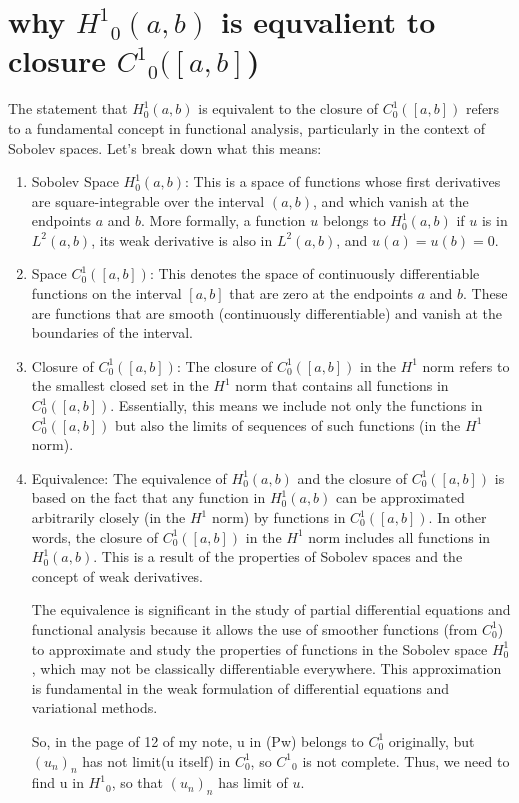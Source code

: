 \documentclass[a4paper,12pt]{article} %
\begin{document}
\newpage
\section{\textbf{why ${H^1}_{0}(a ,b)$ is equvalient to closure ${C^1}_{0}([a ,b]$) }}


The statement that \( H_0^1(a, b) \) is equivalent to the closure of \( C_0^1([a, b]) \) refers to a fundamental concept in functional analysis, particularly in the context of Sobolev spaces. Let's break down what this means:
\begin{enumerate}
   \item Sobolev Space \( H_0^1(a, b) \): This is a space of functions whose first derivatives are square-integrable over the interval \((a, b)\), and which vanish at the endpoints \( a \) and \( b \). More formally, a function \( u \) belongs to \( H_0^1(a, b) \) if \( u \) is in \( L^2(a, b) \), its weak derivative is also in \( L^2(a, b) \), and \( u(a) = u(b) = 0 \).

   \item Space \( C_0^1([a, b]) \): This denotes the space of continuously differentiable functions on the interval \([a, b]\) that are zero at the endpoints \( a \) and \( b \). These are functions that are smooth (continuously differentiable) and vanish at the boundaries of the interval.

   \item Closure of \( C_0^1([a, b]) \): The closure of \( C_0^1([a, b]) \) in the \( H^1 \) norm refers to the smallest closed set in the \( H^1 \) norm that contains all functions in \( C_0^1([a, b]) \). Essentially, this means we include not only the functions in \( C_0^1([a, b]) \) but also the limits of sequences of such functions (in the \( H^1 \) norm).

   \item Equivalence: The equivalence of \( H_0^1(a, b) \) and the closure of \( C_0^1([a, b]) \) is based on the fact that any function in \( H_0^1(a, b) \) can be approximated arbitrarily closely (in the \( H^1 \) norm) by functions in \( C_0^1([a, b]) \). In other words, the closure of \( C_0^1([a, b]) \) in the \( H^1 \) norm includes all functions in \( H_0^1(a, b) \). This is a result of the properties of Sobolev spaces and the concept of weak derivatives.

The equivalence is significant in the study of partial differential equations and functional analysis because it allows the use of smoother functions (from \( C_0^1 \)) to approximate and study the properties of functions in the Sobolev space \( H_0^1 \), which may not be classically differentiable everywhere. This approximation is fundamental in the weak formulation of differential equations and variational methods.

So, in the page of 12 of my note, u in (Pw) belongs to $C^1_0$ originally, but $(u_n)_n$ has not limit(u itself) in $C_0^1$, so ${C^1}_0$ is not complete. Thus, we need to find u in ${H^1}_0$, so that $(u_n)_n$ has limit of $u$.
\end{enumerate}
\end{document}
